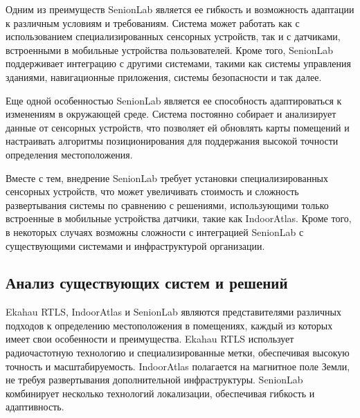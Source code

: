 Одним из преимуществ SenionLab является ее гибкость и возможность адаптации к различным условиям и требованиям. Система может работать как с использованием специализированных сенсорных устройств, так и с датчиками, встроенными в мобильные устройства пользователей. Кроме того, SenionLab поддерживает интеграцию с другими системами, такими как системы управления зданиями, навигационные приложения, системы безопасности и так далее.

Еще одной особенностью SenionLab является ее способность адаптироваться к изменениям в окружающей среде. Система постоянно собирает и анализирует данные от сенсорных устройств, что позволяет ей обновлять карты помещений и настраивать алгоритмы позиционирования для поддержания высокой точности определения местоположения.

Вместе с тем, внедрение SenionLab требует установки специализированных сенсорных устройств, что может увеличивать стоимость и сложность развертывания системы по сравнению с решениями, использующими только встроенные в мобильные устройства датчики, такие как IndoorAtlas. Кроме того, в некоторых случаях возможны сложности с интеграцией SenionLab с существующими системами и инфраструктурой организации.

\subsection{Анализ существующих систем и решений}

Ekahau RTLS, IndoorAtlas и SenionLab являются представителями различных подходов к определению местоположения в помещениях, каждый из которых имеет свои особенности и преимущества. Ekahau RTLS использует радиочастотную технологию и специализированные метки, обеспечивая высокую точность и масштабируемость. IndoorAtlas полагается на магнитное поле Земли, не требуя развертывания дополнительной инфраструктуры. SenionLab комбинирует несколько технологий локализации, обеспечивая гибкость и адаптивность.

